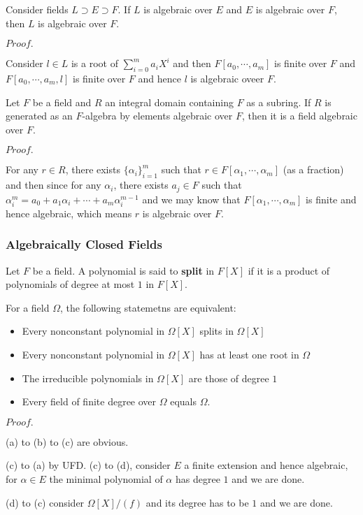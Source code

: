 \documentclass{article}
\newcommand{\Pf}[1]{$Proof.$\par}
\begin{document}
\begin{corollary}
    Consider fields $L\supset E \supset F$. If $L$ is algebraic over $E$ and $E$ is algebraic over $F$, then $L$ is algebraic over $F$.
\end{corollary}
\Pf\par
    Consider $l\in L$ is a root of $\sum\limits_{i=0}^m a_iX^i$ and then $F[a_0,\cdots,a_m]$ is finite over $F$ and $F[a_0,\cdots,a_m,l]$ is finite over $F$ and hence $l$ is algebraic oveer $F$.

\begin{proposition}
    Let $F$ be a field and $R$ an integral domain containing $F$ as a subring. If $R$ is generated as an $F$-algebra by elements algebraic over $F$, then it is a field algebraic over $F$.
\end{proposition}
\Pf\par
    For any $r\in R$, there exists $\{\alpha_i\}_{i=1}^m$ such that $r \in F[\alpha_1,\cdots,\alpha_m]$ (as a fraction) and then since for any $\alpha_i$, there exists $a_j\in F$ such that $\alpha_i^{m} = a_0 + a_1\alpha_i+\cdots+a_m\alpha_i^{m-1}$ and we may know that $F[\alpha_1,\cdots,\alpha_m]$ is finite and hence algebraic, which means $r$ is algebraic over $F$.

\subsubsection{Algebraically Closed Fields}

\begin{definition}
    Let $F$ be a field. A polynomial is said to \textbf{split} in $F[X]$ if it is a product of polynomials of degree at most $1$ in $F[X]$.
\end{definition}

\begin{proposition}
    For a field $\Omega$, the following statemetns are equivalent:\par
    \begin{itemize}
        \item Every nonconstant polynomial in $\Omega[X]$ splits in $\Omega[X]$
        \item Every nonconstant polynomial in $\Omega[X]$ has at least one root in $\Omega$
        \item The irreducible polynomials in $\Omega[X]$ are those of degree $1$
        \item Every field of finite degree over $\Omega$ equals $\Omega$.
    \end{itemize}
\end{proposition}
\Pf\par
    (a) to (b) to (c) are obvious.\par
    (c) to (a) by UFD. (c) to (d), consider $E$ a finite extension and hence algebraic, for $\alpha \in E$ the minimal polynomial of $\alpha$ has degree $1$ and we are done.\par
    (d) to (c) consider $\Omega[X]/(f)$ and its degree has to be $1$ and we are done.
\end{document}
